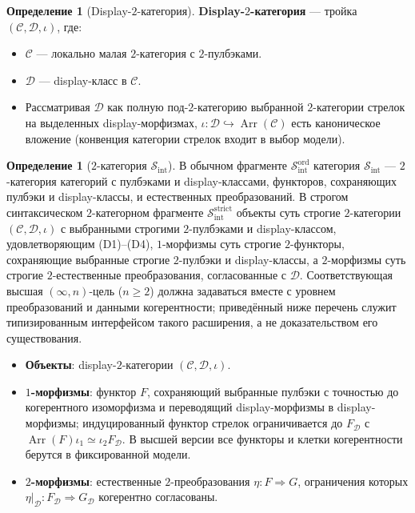\documentclass[11pt]{article}
\theoremstyle{plain}
\theoremstyle{definition}
\newtheorem{definition}[theorem]{Определение}
\newcommand{\cS}{\mathcal{S}}
\newcommand{\cC}{\mathcal{C}}
\newcommand{\cD}{\mathcal{D}}
\newcommand{\Sint}{\cS_{\mathrm{int}}}
\begin{document}
\begin{definition}[Display-$2$-категория]\label{def:display-2-cat}
\textbf{Display-$2$-категория} — тройка $(\cC, \cD, \iota)$, где:
\begin{itemize}
\item $\cC$ — локально малая $2$-категория с $2$-пулбэками.
\item $\cD$ — display-класс в $\cC$.
\item Рассматривая $\cD$ как полную под-$2$-категорию выбранной $2$-категории стрелок на выделенных display-морфизмах, $\iota : \cD \hookrightarrow \operatorname{Arr}(\cC)$ есть каноническое вложение (конвенция категории стрелок входит в выбор модели).
\end{itemize}
\end{definition}

\begin{definition}[$2$-категория $\Sint$]\label{def:Sint}
В обычном фрагменте $\mathcal{S}_{\mathrm{int}}^{\mathrm{ord}}$ категория $\Sint$ — $2$-категория категорий с пулбэками и display-классами, функторов, сохраняющих пулбэки и display-классы, и естественных преобразований. В строгом синтаксическом $2$-категорном фрагменте $\mathcal{S}_{\mathrm{int}}^{\mathrm{strict}}$ объекты суть строгие $2$-категории $(\cC, \cD, \iota)$ с выбранными строгими $2$-пулбэками и display-классом, удовлетворяющим \textup{(D1)--(D4)}, $1$-морфизмы суть строгие $2$-функторы, сохраняющие выбранные строгие $2$-пулбэки и display-классы, а $2$-морфизмы суть строгие $2$-естественные преобразования, согласованные с $\cD$. Соответствующая высшая $(\infty, n)$-цель ($n \ge 2$) должна задаваться вместе с уровнем преобразований и данными когерентности; приведённый ниже перечень служит типизированным интерфейсом такого расширения, а не доказательством его существования.
\begin{itemize}
\item \textbf{Объекты}: display-$2$-категории $(\cC, \cD, \iota)$.
\item \textbf{$1$-морфизмы}: функтор $F$, сохраняющий выбранные пулбэки с точностью до когерентного изоморфизма и переводящий display-морфизмы в display-морфизмы; индуцированный функтор стрелок ограничивается до $F_\cD$ с $\operatorname{Arr}(F)\iota_1 \simeq \iota_2 F_\cD$. В высшей версии все функторы и клетки когерентности берутся в фиксированной модели.
\item \textbf{$2$-морфизмы}: естественные $2$-преобразования $\eta : F \Rightarrow G$, ограничения которых $\eta|_\cD : F_\cD \Rightarrow G_\cD$ когерентно согласованы.
\end{itemize}
\end{definition}
\end{document}
